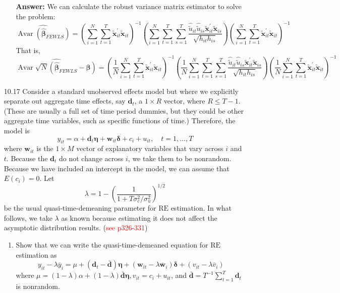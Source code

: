 \begin{enumerate}
\begin{enumerate}
        \textbf{Answer:} We can calculate the robust variance matrix estimator to solve the problem:
        \[ \widehat{\operatorname{Avar} \left( \hat{\bm{\beta}}_{FEWLS} \right)} = \left( \sum_{i=1}^N\sum_{t=1}^{T} \tilde{\mathbf{x}}_{i t}^{\prime} \tilde{\mathbf{x}}_{i t} \right)^{-1} \left( \sum_{i=1}^N\sum_{t=1}^T\sum_{s=1}^T \frac{ \hat{\tilde{u}}_{it} \hat{\tilde{u}}_{is} \tilde{\mathbf{x}}_{it}^{\prime} \tilde{\mathbf{x}}_{is} }{ \sqrt{h_{it} h_{is}} } \right) \left( \sum_{i=1}^N\sum_{t=1}^{T} \tilde{\mathbf{x}}_{i t}^{\prime} \tilde{\mathbf{x}}_{i t} \right)^{-1} \]
        That is, 
        \[ \widehat{\operatorname{Avar}\sqrt{N}\left(\hat{\boldsymbol{\beta}}_{FEWLS}-\boldsymbol{\beta}\right)} = \left( \frac{1}{N} \sum_{i=1}^N\sum_{t=1}^{T} \tilde{\mathbf{x}}_{i t}^{\prime} \tilde{\mathbf{x}}_{i t} \right)^{-1} \left( \frac{1}{N} \sum_{i=1}^N\sum_{t=1}^T\sum_{s=1}^T \frac{ \hat{\tilde{u}}_{it} \hat{\tilde{u}}_{is} \tilde{\mathbf{x}}_{it}^{\prime} \tilde{\mathbf{x}}_{is} }{ \sqrt{h_{it} h_{is}} } \right) \left( \frac{1}{N} \sum_{i=1}^N\sum_{t=1}^{T} \tilde{\mathbf{x}}_{i t}^{\prime} \tilde{\mathbf{x}}_{i t} \right)^{-1} \]
    \end{enumerate}
    
    
    \item[10.17] Consider a standard unobserved effects model but where we explicitly separate out aggregate time effects, say $\mathbf{d}_{t}$, a $1 \times R$ vector, where $R \leq T-1$. (These are usually a full set of time period dummies, but they could be other aggregate time variables, such as specific functions of time.) Therefore, the model is
    \[ y_{i t}=\alpha+\mathbf{d}_{t} \boldsymbol{\eta}+\mathbf{w}_{i t} \boldsymbol{\delta}+c_{i}+u_{i t}, \quad t=1, \ldots, T \]
    where $\mathbf{w}_{i t}$ is the $1 \times M$ vector of explanatory variables that vary across $i$ and $t$. Because the $\mathbf{d}_{t}$ do not change across $i$, we take them to be nonrandom. Because we have included an intercept in the model, we can assume that $E\left(c_{i}\right)=0 .$ Let 
    \[ \lambda = 1 - \left( \frac{1}{\displaystyle 1 + T \sigma_c^2 / \sigma_u^2} \right)^{1/2} \]
    be the usual quasi-time-demeaning parameter for $\mathrm{RE}$ estimation. In what follows, we take $\lambda$ as known because estimating it does not affect the asymptotic distribution results. (\textcolor{red}{see p326-331})
    
    \begin{enumerate}
        \item Show that we can write the quasi-time-demeaned equation for $\mathrm{RE}$ estimation as
        \[ y_{it}-\lambda \bar{y}_{i}=\mu+\left(\mathbf{d}_{t}-\bar{\mathbf{d}}\right) \boldsymbol{\eta}+\left(\mathbf{w}_{i t}-\lambda \overline{\mathbf{w}}_{i}\right) \boldsymbol{\delta}+\left(v_{i t}-\lambda \bar{v}_{i}\right) \]
        where $\mu=(1-\lambda) \alpha+(1-\lambda) \bar{\mathbf{d}} \boldsymbol{\eta}, v_{i t}=c_{i}+u_{i t}$, and $\bar{\mathbf{d}}=T^{-1} \sum_{t=1}^{T} \mathbf{d}_{t}$ is nonrandom.
        

\end{enumerate}
\end{enumerate}
